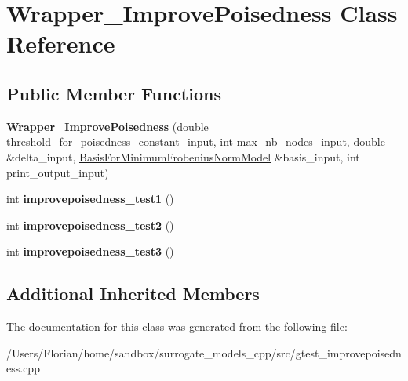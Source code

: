 \hypertarget{class_wrapper___improve_poisedness}{}\section{Wrapper\+\_\+\+Improve\+Poisedness Class Reference}
\label{class_wrapper___improve_poisedness}
\subsection*{Public Member Functions}
\begin{DoxyCompactItemize}
\item 
{\bfseries Wrapper\+\_\+\+Improve\+Poisedness} (double threshold\+\_\+for\+\_\+poisedness\+\_\+constant\+\_\+input, int max\+\_\+nb\+\_\+nodes\+\_\+input, double \&delta\+\_\+input, \hyperlink{class_basis_for_minimum_frobenius_norm_model}{Basis\+For\+Minimum\+Frobenius\+Norm\+Model} \&basis\+\_\+input, int print\+\_\+output\+\_\+input)\hypertarget{class_wrapper___improve_poisedness_a58aba59e62edf099d2783116c24d26a8}{}\label{class_wrapper___improve_poisedness_a58aba59e62edf099d2783116c24d26a8}

\item 
int {\bfseries improvepoisedness\+\_\+test1} ()\hypertarget{class_wrapper___improve_poisedness_a3c862040edeb49fc809847e6965198bb}{}\label{class_wrapper___improve_poisedness_a3c862040edeb49fc809847e6965198bb}

\item 
int {\bfseries improvepoisedness\+\_\+test2} ()\hypertarget{class_wrapper___improve_poisedness_af2653e00700f94b51e66dd5ce9a5a19b}{}\label{class_wrapper___improve_poisedness_af2653e00700f94b51e66dd5ce9a5a19b}

\item 
int {\bfseries improvepoisedness\+\_\+test3} ()\hypertarget{class_wrapper___improve_poisedness_af9ac8ea56f838665b0d53cf3c4f04367}{}\label{class_wrapper___improve_poisedness_af9ac8ea56f838665b0d53cf3c4f04367}

\end{DoxyCompactItemize}
\subsection*{Additional Inherited Members}


The documentation for this class was generated from the following file\+:\begin{DoxyCompactItemize}
\item 
/\+Users/\+Florian/home/sandbox/surrogate\+\_\+models\+\_\+cpp/src/gtest\+\_\+improvepoisedness.\+cpp\end{DoxyCompactItemize}
